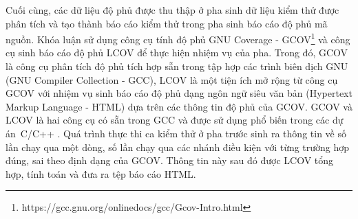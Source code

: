 Cuối cùng, các dữ liệu độ phủ được thu thập ở pha sinh dữ liệu kiểm thử được phân tích và tạo thành báo cáo kiểm thử trong pha sinh báo cáo độ phủ mã nguồn. Khóa luận sử dụng công cụ tính độ phủ GNU Coverage - GCOV\footnote{https://gcc.gnu.org/onlinedocs/gcc/Gcov-Intro.html} và công cụ sinh báo cáo độ phủ LCOV để thực hiện nhiệm vụ của pha. Trong đó, GCOV là công cụ phân tích độ phủ tích hợp sẵn trong tập hợp các trình biên dịch GNU (GNU Compiler Collection - GCC), LCOV là một tiện ích mở rộng từ công cụ GCOV với nhiệm vụ sinh báo cáo độ phủ dạng ngôn ngữ siêu văn bản (Hypertext Markup Language - HTML) dựa trên các thông tin độ phủ của GCOV. GCOV và LCOV là hai công cụ có sẵn trong GCC và được sử dụng phổ biến trong các dự án~C/C++ \cite{hu2021software}. Quá trình thực thi ca kiểm thử ở pha trước sinh ra thông tin về số lần chạy qua một dòng, số lần chạy qua các nhánh điều kiện với từng trường hợp đúng, sai theo định dạng của GCOV. Thông tin này sau đó được LCOV tổng hợp, tính toán và đưa ra tệp báo cáo HTML.